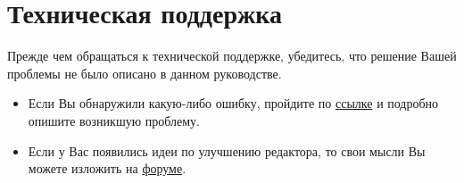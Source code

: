 \newpage
\section{Техническая поддержка}

Прежде чем обращаться к технической поддержке, убедитесь, что решение Вашей проблемы не было описано в данном руководстве.

\begin{itemize}
	\item Если Вы обнаружили какую-либо ошибку, пройдите по \href{http://www.ostis.net/forum/viewtopic.php?f=8&t=283}{ссылке} и подробно опишите возникшую проблему.
	\item Если у Вас появились идеи по улучшению редактора, то свои мысли Вы можете изложить на \href{http://www.ostis.net/forum/viewtopic.php?f=8&t=86}{форуме}.
\end{itemize}
